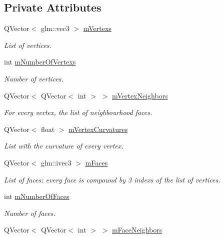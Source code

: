 \subsection*{Private Attributes}
\begin{DoxyCompactItemize}
\item 
Q\+Vector$<$ glm\+::vec3 $>$ \hyperlink{class_serialized_scene_geometry_a34ba752883c681daccd5ac0856bdf7ee}{m\+Vertexs}
\begin{DoxyCompactList}\small\item\em List of vertices. \end{DoxyCompactList}\item 
int \hyperlink{class_serialized_scene_geometry_ae1a661fbede75f45b394cf148eca7ff7}{m\+Number\+Of\+Vertexs}
\begin{DoxyCompactList}\small\item\em Number of vertices. \end{DoxyCompactList}\item 
Q\+Vector$<$ Q\+Vector$<$ int $>$ $>$ \hyperlink{class_serialized_scene_geometry_a048df2ca66652a2b4150f289b6da459e}{m\+Vertex\+Neighbors}
\begin{DoxyCompactList}\small\item\em For every vertex, the list of neighbourhood faces. \end{DoxyCompactList}\item 
Q\+Vector$<$ float $>$ \hyperlink{class_serialized_scene_geometry_aec2daaca28e73a73128c926d2e4a5dcf}{m\+Vertex\+Curvatures}
\begin{DoxyCompactList}\small\item\em List with the curvature of every vertex. \end{DoxyCompactList}\item 
Q\+Vector$<$ glm\+::ivec3 $>$ \hyperlink{class_serialized_scene_geometry_a9de02e07c46f0638cbae956657c2a3e6}{m\+Faces}
\begin{DoxyCompactList}\small\item\em List of faces\+: every face is compound by 3 indexs of the list of vertices. \end{DoxyCompactList}\item 
int \hyperlink{class_serialized_scene_geometry_a1526976e28d085ca2677d56cf395dfd6}{m\+Number\+Of\+Faces}
\begin{DoxyCompactList}\small\item\em Number of faces. \end{DoxyCompactList}\item 
Q\+Vector$<$ Q\+Vector$<$ int $>$ $>$ \hyperlink{class_serialized_scene_geometry_afc874eba53475c29a8895b8c1cece867}{m\+Face\+Neighbors}

\end{DoxyCompactItemize}
